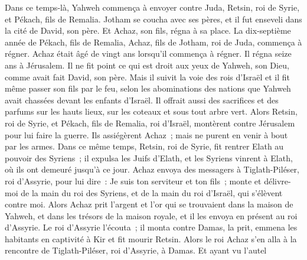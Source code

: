 \begin{multicols}{2}
Dans ce temps-là, Yahweh commença à envoyer contre Juda, Retsin, roi de Syrie, et Pékach, fils de Remalia.
Jotham se coucha avec ses pères, et il fut enseveli dans la cité de David, son père. Et Achaz, son fils, régna à sa place.
\VerseOne{}La dix-septième année de Pékach, fils de Remalia, Achaz, fils de Jotham, roi de Juda, commença à régner.
Achaz était âgé de vingt ans lorsqu'il commença à régner. Il régna seize ans à Jérusalem. Il ne fit point ce qui est droit aux yeux de Yahweh, son Dieu, comme avait fait David, son père.
Mais il suivit la voie des rois d'Israël et il fit même passer son fils par le feu, selon les abominations des nations que Yahweh avait chassées devant les enfants d'Israël.
Il offrait aussi des sacrifices et des parfums sur les hauts lieux, sur les coteaux et sous tout arbre vert.
Alors Retsin, roi de Syrie, et Pékach, fils de Remalia, roi d'Israël, montèrent contre Jérusalem pour lui faire la guerre. Ils assiégèrent Achaz~; mais ne purent en venir à bout par les armes.
Dans ce même temps, Retsin, roi de Syrie, fit rentrer Elath au pouvoir des Syriens~; il expulsa les Juifs d'Elath, et les Syriens vinrent à Elath, où ils ont demeuré jusqu'à ce jour.
Achaz envoya des messagers à Tiglath-Piléser, roi d'Assyrie, pour lui dire~: Je suis ton serviteur et ton fils~; monte et délivre-moi de la main du roi des Syriens, et de la main du roi d'Israël, qui s'élèvent contre moi.
Alors Achaz prit l'argent et l'or qui se trouvaient dans la maison de Yahweh, et dans les trésors de la maison royale, et il les envoya en présent au roi d'Assyrie.
Le roi d'Assyrie l'écouta~; il monta contre Damas, la prit, emmena les habitants en captivité à Kir et fit mourir Retsin.
Alors le roi Achaz s'en alla à la rencontre de Tiglath-Piléser, roi d'Assyrie, à Damas. Et ayant vu l'autel
\end{multicols}
